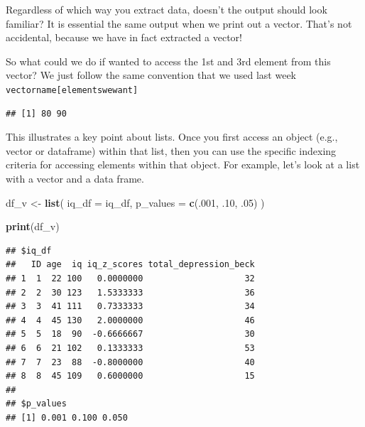 \documentclass[
]{book}
\newenvironment{Shaded}{\begin{snugshade}}{\end{snugshade}}
\newcommand{\AttributeTok}[1]{\textcolor[rgb]{0.13,0.29,0.53}{#1}}
\newcommand{\DecValTok}[1]{\textcolor[rgb]{0.00,0.00,0.81}{#1}}
\newcommand{\FunctionTok}[1]{\textcolor[rgb]{0.13,0.29,0.53}{\textbf{#1}}}
\newcommand{\NormalTok}[1]{#1}
\newcommand{\OtherTok}[1]{\textcolor[rgb]{0.56,0.35,0.01}{#1}}
\newcommand{\SpecialCharTok}[1]{\textcolor[rgb]{0.81,0.36,0.00}{\textbf{#1}}}
\begin{document}
Regardless of which way you extract data, doesn't the output should look familiar? It is essential the same output when we print out a vector. That's not accidental, because we have in fact extracted a vector!

So what could we do if wanted to access the 1st and 3rd element from this vector? We just follow the same convention that we used last week \texttt{vectorname{[}elementswewant{]}}

\begin{Shaded}
\end{Shaded}

\begin{verbatim}
## [1] 80 90
\end{verbatim}

This illustrates a key point about lists. Once you first access an object (e.g., vector or dataframe) within that list, then you can use the specific indexing criteria for accessing elements within that object. For example, let's look at a list with a vector and a data frame.

\begin{Shaded}
\begin{Highlighting}[]
\NormalTok{df\_v }\OtherTok{\textless{}{-}} \FunctionTok{list}\NormalTok{(}
  \AttributeTok{iq\_df =}\NormalTok{ iq\_df, }
  \AttributeTok{p\_values =} \FunctionTok{c}\NormalTok{(.}\DecValTok{001}\NormalTok{, .}\DecValTok{10}\NormalTok{, .}\DecValTok{05}\NormalTok{)}
\NormalTok{)}

\FunctionTok{print}\NormalTok{(df\_v)}
\end{Highlighting}
\end{Shaded}

\begin{verbatim}
## $iq_df
##   ID age  iq iq_z_scores total_depression_beck
## 1  1  22 100   0.0000000                    32
## 2  2  30 123   1.5333333                    36
## 3  3  41 111   0.7333333                    34
## 4  4  45 130   2.0000000                    46
## 5  5  18  90  -0.6666667                    30
## 6  6  21 102   0.1333333                    53
## 7  7  23  88  -0.8000000                    40
## 8  8  45 109   0.6000000                    15
## 
## $p_values
## [1] 0.001 0.100 0.050
\end{verbatim}
\end{document}
